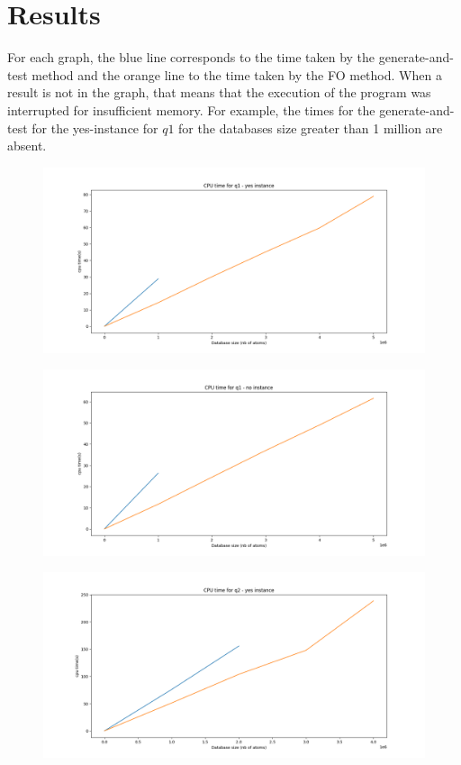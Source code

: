 
\section{Results}

For each graph, the blue line corresponds to the time taken by the
generate-and-test method and the orange line to the time taken by the FO
method. When a result is not in the graph, that means that the execution of the
program was interrupted for insufficient memory. For example, the times for the
generate-and-test for the yes-instance for $q1$ for the databases size greater
than 1 million are absent.

\begin{figure}[H]
\includegraphics[width=\textwidth]{time_q1_yesinstance.png}
\centering
\end{figure}

\begin{figure}[H]
\includegraphics[width=\textwidth]{time_q1_noinstance.png}
\centering
\end{figure}

\begin{figure}[H]
\includegraphics[width=\textwidth]{time_q2_yesinstance.png}
\centering
\end{figure}

